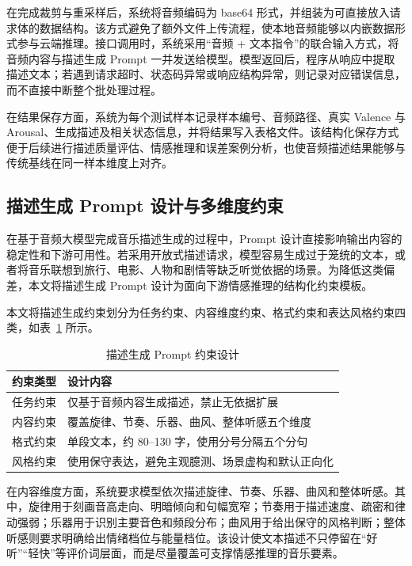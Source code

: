 在完成裁剪与重采样后，系统将音频编码为 base64 形式，并组装为可直接放入请求体的数据结构。该方式避免了额外文件上传流程，使本地音频能够以内嵌数据形式参与云端推理。接口调用时，系统采用“音频 + 文本指令”的联合输入方式，将音频内容与描述生成 Prompt 一并发送给模型。模型返回后，程序从响应中提取描述文本；若遇到请求超时、状态码异常或响应结构异常，则记录对应错误信息，而不直接中断整个批处理过程。

在结果保存方面，系统为每个测试样本记录样本编号、音频路径、真实 Valence 与 Arousal、生成描述及相关状态信息，并将结果写入表格文件。该结构化保存方式便于后续进行描述质量评估、情感推理和误差案例分析，也使音频描述结果能够与传统基线在同一样本维度上对齐。

\subsection{描述生成 Prompt 设计与多维度约束}

在基于音频大模型完成音乐描述生成的过程中，Prompt 设计直接影响输出内容的稳定性和下游可用性。若采用开放式描述请求，模型容易生成过于笼统的文本，或者将音乐联想到旅行、电影、人物和剧情等缺乏听觉依据的场景。为降低这类偏差，本文将描述生成 Prompt 设计为面向下游情感推理的结构化约束模板\cite{li2025revise,yan2023contrastive,zhang2024threelevel}。

本文将描述生成约束划分为任务约束、内容维度约束、格式约束和表达风格约束四类，如表~\ref{tab:prompt-constraints} 所示。

\begin{table}[htbp]
  \centering
  \caption{描述生成 Prompt 约束设计}
  \label{tab:prompt-constraints}
  \begin{tabular}{ll}
    \hline
    约束类型 & 设计内容 \\
    \hline
    任务约束 & 仅基于音频内容生成描述，禁止无依据扩展 \\
    内容约束 & 覆盖旋律、节奏、乐器、曲风、整体听感五个维度 \\
    格式约束 & 单段文本，约 80--130 字，使用分号分隔五个分句 \\
    风格约束 & 使用保守表达，避免主观臆测、场景虚构和默认正向化 \\
    \hline
  \end{tabular}
\end{table}

在内容维度方面，系统要求模型依次描述旋律、节奏、乐器、曲风和整体听感。其中，旋律用于刻画音高走向、明暗倾向和句幅宽窄；节奏用于描述速度、疏密和律动强弱；乐器用于识别主要音色和频段分布；曲风用于给出保守的风格判断；整体听感则要求明确给出情绪档位与能量档位。该设计使文本描述不只停留在“好听”“轻快”等评价词层面，而是尽量覆盖可支撑情感推理的音乐要素。

